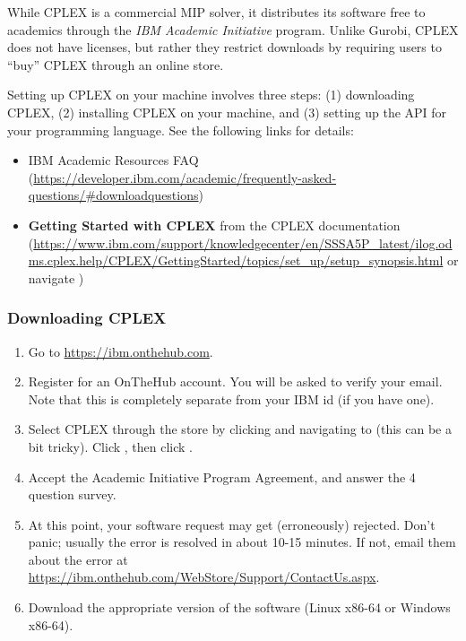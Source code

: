 \documentclass[12pt]{article}
\begin{document}
While CPLEX is a commercial MIP solver, it distributes its software free to academics through the \emph{IBM Academic Initiative} program.
Unlike Gurobi, CPLEX does not have licenses, but rather they restrict downloads by requiring users to ``buy'' CPLEX through an online store.

Setting up CPLEX on your machine involves three steps: (1) downloading CPLEX, (2) installing CPLEX on your machine, and (3) setting up the API for your programming language.
See the following links for details:
\begin{itemize}
    \item IBM Academic Resources FAQ (\url{https://developer.ibm.com/academic/frequently-asked-questions/\#downloadquestions})
    \item \textbf{Getting Started with CPLEX} from the CPLEX documentation (\url{https://www.ibm.com/support/knowledgecenter/en/SSSA5P_latest/ilog.odms.cplex.help/CPLEX/GettingStarted/topics/set_up/setup_synopsis.html} or navigate )
\end{itemize}
\subsubsection{Downloading CPLEX}
\begin{enumerate}
    \item Go to \url{https://ibm.onthehub.com}.
    \item Register for an OnTheHub account.
        You will be asked to verify your email.
        Note that this is completely separate from your IBM id (if you have one).
    \item Select CPLEX through the store by clicking  and navigating to  (this can be a bit tricky). 
        Click , then click .
    \item Accept the Academic Initiative Program Agreement, and answer the 4 question survey.
    \item At this point, your software request may get (erroneously) rejected.
        Don't panic; usually the error is resolved in about 10-15 minutes.
        If not, email them about the error at \url{https://ibm.onthehub.com/WebStore/Support/ContactUs.aspx}.
    \item Download the appropriate version of the software (Linux x86-64 or Windows x86-64).
\end{enumerate}
\end{document}
